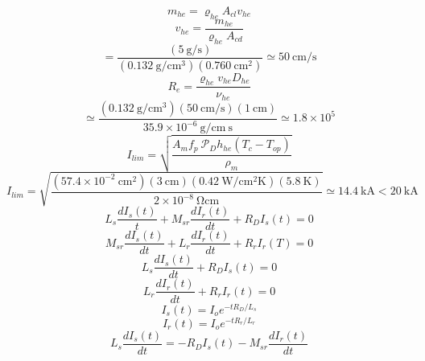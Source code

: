 \begin{equation}%
m_{he}=\varrho_{he}A_{cl}v_{he}
\end{equation}
\begin{equation}%
v_{he}=\frac{m_{he}}{\varrho_{he}A_{cd}}
\end{equation}
\begin{equation}%
=\frac{(5\ \mathrm{g/s})}{(0.132\ \mathrm{g/cm^3})(0.760\ \mathrm{cm^2})}\simeq50\ \mathrm{cm/s}
\end{equation}
\begin{equation}%
R_e=\frac{\varrho_{he}v_{he}D_{he}}{\nu_{he}}
\end{equation}
\begin{equation}%
\simeq\frac{(0.132\ \mathrm{g/cm^3})(50\ \mathrm{cm/s})(1\ \mathrm{cm})}{35.9\times10^{-6}\ \mathrm{g/cm\ s}}\simeq1.8\times10^5
\end{equation}
\begin{equation}%
I_{lim}=\sqrt{\frac{A_mf_p\ \mathcal{P}_Dh_{he}(T_c-T_{op})}{\rho_m}}
\end{equation}
\begin{equation}%
I_{lim}=\sqrt{\frac{(57.4\times10^{-2}\ \mathrm{cm^2})(3\ \mathrm{cm})(0.42\ \mathrm{W/cm^2K})(5.8\ \mathrm{K})}{2\times10^{-8}\ \mathrm{\Omega cm}}}\simeq 14.4\ \mathrm{kA}<20\ \mathrm{kA}
\end{equation}
\begin{equation}%
L_s\frac{dI_s(t)}{t}+M_{sr}\frac{dI_r(t)}{dt}+R_DI_s(t)=0
\end{equation}
\begin{equation}%
M_{sr}\frac{dI_s(t)}{dt}+L_r\frac{dI_r(t)}{dt}+R_rI_r(T)=0
\end{equation}
\begin{equation}%
L_s\frac{dI_s(t)}{dt}+R_DI_s(t)=0
\end{equation}
\begin{equation}%
L_r\frac{dI_r(t)}{dt}+R_rI_r(t)=0
\end{equation}
\begin{equation}%
I_s(t)=I_oe^{-tR_D/L_s}
\end{equation}
\begin{equation}%
I_r(t)=I_oe^{-tR_r/L_r}
\end{equation}
\begin{equation}%
L_s\frac{dI_s(t)}{dt}=-R_DI_s(t)-M_{sr}\frac{dI_r(t)}{dt}
\end{equation}
